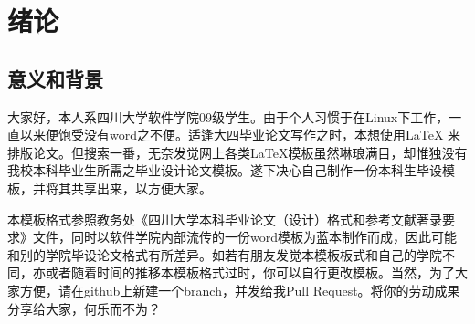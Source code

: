 \chapter{绪论}
\section{意义和背景}
大家好，本人系四川大学软件学院09级学生。由于个人习惯于在Linux下工作，一直以来便饱受没有word之不便。适逢大四毕业论文写作之时，本想使用\LaTeX{}\cite{knuth1986texbook} 来排版论文。但搜索一番，无奈发觉网上各类\LaTeX 模板虽然琳琅满目，却惟独没有我校本科毕业生所需之毕业设计论文模板。遂下决心自己制作一份本科生毕设模板，并将其共享出来，以方便大家。

本模板格式参照教务处《四川大学本科毕业论文（设计）格式和参考文献著录要求》文件，同时以软件学院内部流传的一份word模板为蓝本制作而成，因此可能和别的学院毕设论文格式有所差异。如若有朋友发觉本模板板式和自己的学院不同，亦或者随着时间的推移本模板格式过时，你可以自行更改模板。当然，为了大家方便，请在github上新建一个branch，并发给我Pull Request。将你的劳动成果分享给大家，何乐而不为？